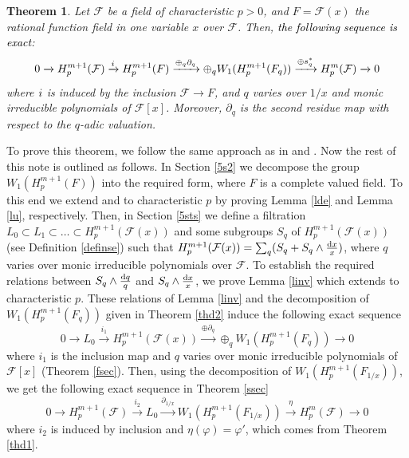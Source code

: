 \documentclass[times,10pt]{amsart}
\newcommand{\dd}{{\rm d}}
\newcommand{\F}{\ensuremath{\mathcal{F}}}
\renewcommand{\phi}{\varphi}
\newtheorem{thm}{Theorem}[section]
\begin{document}
\begin{thm}\label{myth} Let $\mathcal{F}$ be a field of characteristic {$p>0$}, and $F=\mathcal{F}(x)$ the rational function field in one variable $x$ over $\mathcal{F}$. Then, \textcolor{black}{the following   sequence is    exact}:\[ 0\xrightarrow{} H_p^{m+1}(\mathcal{F})\xrightarrow{\textcolor{black}{i}}  H_p^{m+1}(F)\xrightarrow{{\oplus_{q}\partial_q}}\displaystyle{ \oplus_{q}W_1(H_p^{m+1}(F_q))} \xrightarrow{\oplus s_q^*} H_p^m(\F)\xrightarrow{}0\] where $\textcolor{black}{i}$ is induced by 
 the inclusion $ \mathcal{F}\xrightarrow{}F$, and $q$ varies  over ${1}/{x}$ and  monic irreducible polynomials  of $\mathcal{F}[x]$. Moreover, $\partial_q$ is the second residue map with respect to the $q$-adic valuation.
\end{thm}
To prove this theorem, we follow the same approach  {as in  \cite{ex} and \cite{Laghribi-Maiti}}.
Now  the rest of this {note is} outlined as follows.       In Section \ref{5s2} we decompose the group $W_1(H_p^{m+1}(F))$ into the required form, where $F$ is a complete valued field. To this end we extend \cite[Lemma 2.3]{ex}  and \cite[Proposition 1.5]{AJ} to characteristic $p$ by proving Lemma  \ref{lde} and Lemma \ref{lu}, respectively.
Then, in Section \ref{5sts} we  define a filtration 
 $L_0\subset L_1\subset \ldots\subset H_p^{m+1}(\F(x))$ and some subgroups $S_q$ of $H_p^{m+1}(\F(x))$ (see Definition \ref{definse}) such that  $ H_p^{m+1}(\F(x))=\sum_{q} (S_q+S_q\wedge \frac{\dd x}{x})$, where $q$ varies over monic  irreducible polynomials over $\F$. To establish the required relations between $ S_q\wedge \frac{\dd q}{q}$ and $S_q\wedge \frac{\dd x}{x}$,   we prove Lemma \ref{linv} which extends \cite[Lemma 2.6]{AJ} to characteristic $p$.   These relations of Lemma \ref{linv} and  the decomposition of  $W_1(H_p^{m+1}(F_q))$ {given in} Theorem \ref{thd2}   induce the  following exact sequence \begin{equation}\label{ei1}
      0\xrightarrow{}L_0\xrightarrow{i_1}H_p^{m+1}(\F(x))\xrightarrow{\oplus \partial_q}\oplus_{q} W_1(H_p^{m+1}(F_q))\xrightarrow{}0\end{equation} where $i_1$ is the inclusion map  and   $q$ varies over monic irreducible polynomials of $\F[x]$ (Theorem \ref{fsec}).  Then, using the decomposition of $W_1(H_p^{m+1}(F_{1/x}))$, we get the following exact sequence  in Theorem \ref{ssec} \begin{equation}\label{ei2} 0\xrightarrow{}H_p^{m+1}(\F)\xrightarrow{i_2} L_0\xrightarrow{\partial_{1/x}} W_1(H_p^{m+1}(F_{1/x}))\xrightarrow{\eta} H_p^m(\F)\xrightarrow{}0
           \end{equation} where $i_2$ is induced by inclusion and $\eta(\phi)=\phi'$, which comes from Theorem \ref{thd1}. \\
\end{document}
